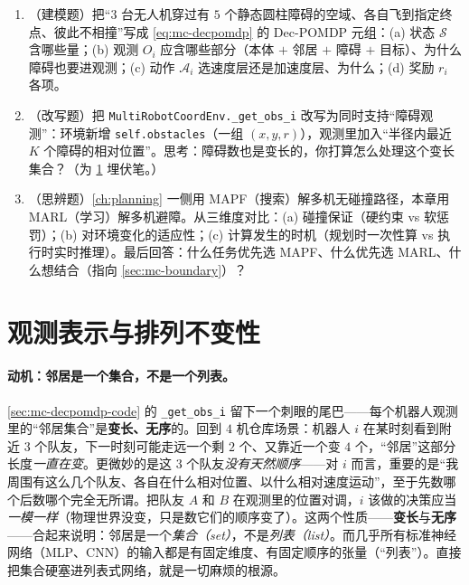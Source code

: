 \begin{practice}
\begin{enumerate}
  \item （建模题）把“$3$ 台无人机穿过有 $5$ 个静态圆柱障碍的空域、各自飞到指定终点、彼此不相撞”写成 \cref{eq:mc-decpomdp} 的 Dec-POMDP 元组：(a) 状态 $\mathcal{S}$ 含哪些量；(b) 观测 $O_i$ 应含哪些部分（本体 $+$ 邻居 $+$ 障碍 $+$ 目标）、为什么障碍也要进观测；(c) 动作 $\mathcal{A}_i$ 选速度层还是加速度层、为什么；(d) 奖励 $r_i$ 各项。
  \item （改写题）把 \verb|MultiRobotCoordEnv._get_obs_i| 改写为同时支持“障碍观测”：环境新增 \verb|self.obstacles|（一组 $(x,y,r)$），观测里加入“半径内最近 $K$ 个障碍的相对位置”。思考：障碍数也是变长的，你打算怎么处理这个变长集合？（为 \cref{sec:mc-perminv} 埋伏笔。）
  \item （思辨题）\cref{ch:planning} 一侧用 MAPF（搜索）解多机无碰撞路径，本章用 MARL（学习）解多机避障。从三维度对比：(a) 碰撞保证（硬约束 vs 软惩罚）；(b) 对环境变化的适应性；(c) 计算发生的时机（规划时一次性算 vs 执行时实时推理）。最后回答：什么任务优先选 MAPF、什么优先选 MARL、什么想结合（指向 \cref{sec:mc-boundary}）？
\end{enumerate}
\end{practice}

\section{观测表示与排列不变性}
\label{sec:mc-perminv}

\paragraph{动机：邻居是一个集合，不是一个列表。}
\cref{sec:mc-decpomdp-code} 的 \verb|_get_obs_i| 留下一个刺眼的尾巴——每个机器人观测里的“邻居集合”是\textbf{变长、无序}的。回到 $4$ 机仓库场景：机器人 $i$ 在某时刻看到附近 $3$ 个队友，下一时刻可能走远一个剩 $2$ 个、又靠近一个变 $4$ 个，“邻居”这部分长度\emph{一直在变}。更微妙的是这 $3$ 个队友\emph{没有天然顺序}——对 $i$ 而言，重要的是“我周围有这么几个队友、各自在什么相对位置、以什么相对速度运动”，至于先数哪个后数哪个完全无所谓。把队友 $A$ 和 $B$ 在观测里的位置对调，$i$ 该做的决策应当\emph{一模一样}（物理世界没变，只是数它们的顺序变了）。这两个性质——\textbf{变长}与\textbf{无序}——合起来说明：邻居是一个\emph{集合（set）}，不是\emph{列表（list）}。而几乎所有标准神经网络（MLP、CNN）的输入都是有固定维度、有固定顺序的张量（“列表”）。直接把集合硬塞进列表式网络，就是一切麻烦的根源。

